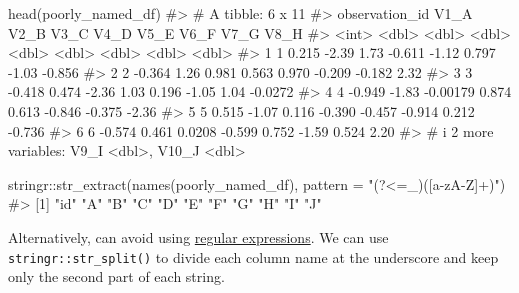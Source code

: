 \documentclass[
  letterpaper,
  DIV=11,
  numbers=noendperiod]{scrreprt}
\newenvironment{Shaded}{\begin{snugshade}}{\end{snugshade}}
\newcommand{\AttributeTok}[1]{\textcolor[rgb]{0.40,0.45,0.13}{#1}}
\newcommand{\CommentTok}[1]{\textcolor[rgb]{0.37,0.37,0.37}{#1}}
\newcommand{\FunctionTok}[1]{\textcolor[rgb]{0.28,0.35,0.67}{#1}}
\newcommand{\NormalTok}[1]{\textcolor[rgb]{0.00,0.23,0.31}{#1}}
\newcommand{\SpecialCharTok}[1]{\textcolor[rgb]{0.37,0.37,0.37}{#1}}
\newcommand{\StringTok}[1]{\textcolor[rgb]{0.13,0.47,0.30}{#1}}
\begin{document}
\begin{Shaded}
\begin{Highlighting}[]
\FunctionTok{head}\NormalTok{(poorly\_named\_df)}
\CommentTok{\#\textgreater{} \# A tibble: 6 x 11}
\CommentTok{\#\textgreater{}   observation\_id   V1\_A   V2\_B     V3\_C   V4\_D   V5\_E   V6\_F   V7\_G    V8\_H}
\CommentTok{\#\textgreater{}            \textless{}int\textgreater{}  \textless{}dbl\textgreater{}  \textless{}dbl\textgreater{}    \textless{}dbl\textgreater{}  \textless{}dbl\textgreater{}  \textless{}dbl\textgreater{}  \textless{}dbl\textgreater{}  \textless{}dbl\textgreater{}   \textless{}dbl\textgreater{}}
\CommentTok{\#\textgreater{} 1              1  0.215 {-}2.39   1.73    {-}0.611 {-}1.12   0.797 {-}1.03  {-}0.856 }
\CommentTok{\#\textgreater{} 2              2 {-}0.364  1.26   0.981    0.563  0.970 {-}0.209 {-}0.182  2.32  }
\CommentTok{\#\textgreater{} 3              3 {-}0.418  0.474 {-}2.36     1.03   0.196 {-}1.05   1.04  {-}0.0272}
\CommentTok{\#\textgreater{} 4              4 {-}0.949 {-}1.83  {-}0.00179  0.874  0.613 {-}0.846 {-}0.375 {-}2.36  }
\CommentTok{\#\textgreater{} 5              5  0.515 {-}1.07   0.116   {-}0.390 {-}0.457 {-}0.914  0.212 {-}0.736 }
\CommentTok{\#\textgreater{} 6              6 {-}0.574  0.461  0.0208  {-}0.599  0.752 {-}1.59   0.524  2.20  }
\CommentTok{\#\textgreater{} \# i 2 more variables: V9\_I \textless{}dbl\textgreater{}, V10\_J \textless{}dbl\textgreater{}}
\end{Highlighting}
\end{Shaded}

\begin{Shaded}
\begin{Highlighting}[]
\NormalTok{stringr}\SpecialCharTok{::}\FunctionTok{str\_extract}\NormalTok{(}\FunctionTok{names}\NormalTok{(poorly\_named\_df), }\AttributeTok{pattern =} \StringTok{"(?\textless{}=\_)([a{-}zA{-}Z]+)"}\NormalTok{)}
\CommentTok{\#\textgreater{}  [1] "id" "A"  "B"  "C"  "D"  "E"  "F"  "G"  "H"  "I"  "J"}
\end{Highlighting}
\end{Shaded}

Alternatively, can avoid using
\href{https://en.wikipedia.org/wiki/Regular_expression}{regular
expressions}. We can use \texttt{stringr::str\_split()} to divide each
column name at the underscore and keep only the second part of each
string.
\end{document}
